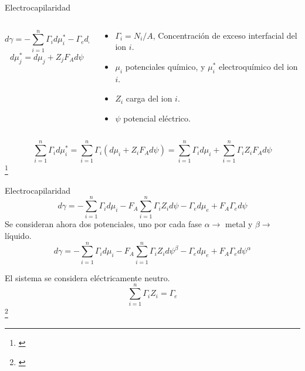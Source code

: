 \documentclass[handout]{beamer}
\newcommand\blfootnote[1]
{%
	\begingroup
	\renewcommand\thefootnote{}\footnote{#1}%
	\addtocounter{footnote}{-1}%
	\endgroup
}
\newcommand{\fcite}[1]{\blfootnote{\cite{#1}}}
\begin{document}
\begin{frame}{Electrocapilaridad}
	\small
	\begin{columns}
		\begin{column}{0.6\textwidth}
			\begin{equation}\label{eq: gd}
				d\gamma = -\sum\limits_{i=1}^n\Gamma_id\mu_i^* - \Gamma_ed\mu_e^*
			\end{equation}
			\begin{equation}\label{eq: mu}
				d\mu_j^* = d\mu_j + Z_jF_Ad\psi
			\end{equation}
		\end{column}
		\begin{column}{0.4\textwidth}
			\begin{itemize}
				\item $\Gamma_i = N_i/A$, Concentraci\'on de exceso interfacial del ion $i$.
				\item $\mu_i$ potenciales qu\'imico, y $\mu_i^*$ electroqu\'imico del ion $i$.
				\item $Z_i$ carga del ion $i$.
				\item $\psi$ potencial el\'ectrico.
			\end{itemize}
		\end{column}
	\end{columns}

	\begin{equation}
		\sum\limits_{i=1}^n\Gamma_id\mu_i^* = \sum\limits_{i=1}^n\Gamma_i(d\mu_i + Z_iF_Ad\psi) = \sum\limits_{i=1}^n\Gamma_id\mu_i + \sum\limits_{i=1}^n\Gamma_iZ_iF_Ad\psi
	\end{equation}
	\fcite{butt2006physics}
\end{frame}

\begin{frame}{Electrocapilaridad}
	\small
	\begin{equation}
		d\gamma = -\sum\limits_{i=1}^n\Gamma_id\mu_i - F_A\sum\limits_{i=1}^n\Gamma_iZ_id\psi - \Gamma_ed\mu_e + F_A\Gamma_ed\psi
	\end{equation}
	Se consideran ahora dos potenciales, uno por cada fase $\alpha\rightarrow$ metal y $\beta\rightarrow$ l\'iquido.
	\begin{equation}
		d\gamma = -\sum\limits_{i=1}^n\Gamma_id\mu_i - F_A\sum\limits_{i=1}^n\Gamma_iZ_id\psi^\beta - \Gamma_ed\mu_e + F_A\Gamma_ed\psi^\alpha
	\end{equation}
	
	El sistema se considera el\'ectricamente neutro.
	\begin{equation}
		\sum\limits_{i=1}^n\Gamma_iZ_i = \Gamma_e
	\end{equation}
	\fcite{butt2006physics}
\end{frame}
\end{document}

